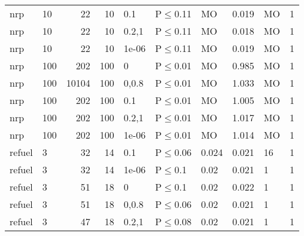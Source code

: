 \begin{longtable}{llrrllllll}
 nrp           & 10        &     	22 &  10 & 0.1   & P$\leq$0.11  & MO      & 0.019   & MO      & 1    \\
 nrp           & 10        &     	22 &  10 & 0.2,1 & P$\leq$0.11  & MO      & 0.018   & MO      & 1    \\
 nrp           & 10        &     	22 &  10 & 1e-06 & P$\leq$0.11  & MO      & 0.019   & MO      & 1    \\
 nrp           & 100       &    	202 & 100 & 0     & P$\leq$0.01  & MO      & 0.985   & MO      & 1    \\
 nrp           & 100       &  	10104 & 100 & 0,0.8 & P$\leq$0.01  & MO      & 1.033   & MO      & 1    \\
 nrp           & 100       &    	202 & 100 & 0.1   & P$\leq$0.01  & MO      & 1.005   & MO      & 1    \\
 nrp           & 100       &    	202 & 100 & 0.2,1 & P$\leq$0.01  & MO      & 1.017   & MO      & 1    \\
 nrp           & 100       &    	202 & 100 & 1e-06 & P$\leq$0.01  & MO      & 1.014   & MO      & 1    \\
 refuel        & 3         &     	32 &  14 & 0.1   & P$\leq$0.06  & 0.024   & 0.021   & 16      & 1    \\
 refuel        & 3         &     	32 &  14 & 1e-06 & P$\leq$0.1   & 0.02    & 0.021   & 1       & 1    \\
 refuel        & 3         &     	51 &  18 & 0     & P$\leq$0.1   & 0.02    & 0.022   & 1       & 1    \\
 refuel        & 3         &     	51 &  18 & 0,0.8 & P$\leq$0.06  & 0.02    & 0.021   & 1       & 1    \\
 refuel        & 3         &     	47 &  18 & 0.2,1 & P$\leq$0.08  & 0.02    & 0.021   & 1       & 1    \\
\bottomrule
\end{longtable}
